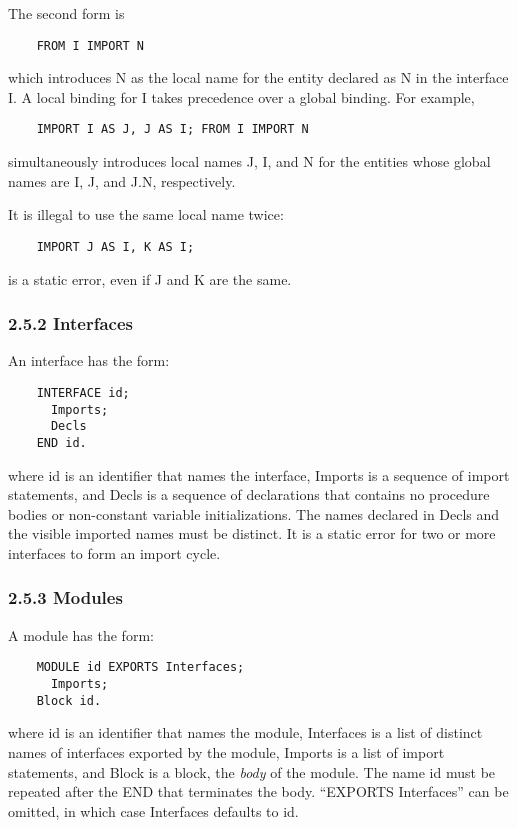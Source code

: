 \documentclass[10pt]{article}
\begin{document}
 The second form is 
\begin{verbatim}
    FROM I IMPORT N
\end{verbatim}
 which introduces N as the local name for the entity declared as N in the interface I. A local binding for I takes precedence over a global binding. For example, 
\begin{verbatim}
    IMPORT I AS J, J AS I; FROM I IMPORT N
\end{verbatim}
 simultaneously introduces local names J, I, and N for the entities whose global names are I, J, and J.N, respectively. 


  It is illegal to use the same local name twice: 
\begin{verbatim}
    IMPORT J AS I, K AS I;
\end{verbatim}
 is a static error, even if J and K are the same. 


 
\subsubsection*{2.5.2 Interfaces}


  An interface has the form: 
\begin{verbatim}
    INTERFACE id;
      Imports;
      Decls
    END id.
\end{verbatim}
 where id is an identifier that names the interface,  Imports is a sequence of import statements, and Decls is a sequence of declarations that contains no procedure bodies or non-constant variable initializations. The names declared in  Decls and the visible imported names must be distinct. It is a static error for two or more interfaces to form an import cycle. 


 
\subsubsection*{2.5.3 Modules}


  A module has the form: 
\begin{verbatim}
    MODULE id EXPORTS Interfaces;
      Imports;
    Block id.
\end{verbatim}
 where id is an identifier that names the module, Interfaces is a list of distinct names of interfaces exported by the module, Imports is a list of import statements, and Block is a block, the \emph{body}
 of the module. The name id must be repeated after the END that terminates the body. ``EXPORTS Interfaces'' can be omitted, in which case Interfaces defaults to id. 
\end{document}
